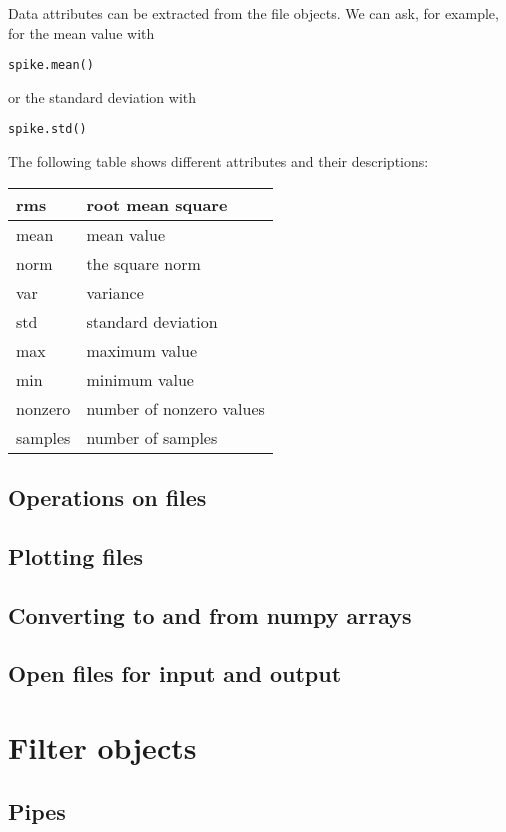 Data attributes can be extracted from the file objects. We can ask, for example, for the mean
value with
\begin{lstlisting}
spike.mean()
\end{lstlisting}
or the standard deviation with
\begin{lstlisting}
spike.std()
\end{lstlisting}

The following table shows different attributes and their descriptions:

\begin{tabular}{ l | l }
  \hline 
  rms & root mean square \\
  \hline   mean & mean value \\
  \hline  norm & the square norm \\
  \hline var & variance \\
  \hline std & standard deviation \\
  \hline max & maximum value \\
  \hline min & minimum value \\
  \hline nonzero & number of nonzero values \\
  \hline samples & number of samples \\
  \hline
\end{tabular}

\subsection{Operations on files}

\subsection{Plotting files}

\subsection{Converting to and from numpy arrays}

\subsection{Open files for input and output}

\section{Filter objects}

\subsection{Pipes}

